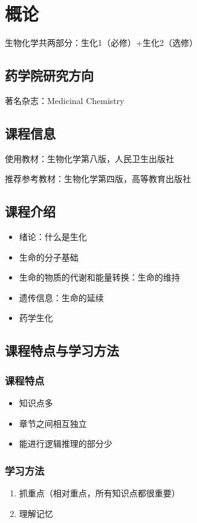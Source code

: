 \section{概论}%
\label{sec:概论}
生物化学共两部分：生化1（必修）+生化2（选修）
\subsection{药学院研究方向}%
\label{sub:药学院研究方向}
著名杂志：Medicinal Chemistry
\subsection{课程信息}%
\label{sub:课程信息}
使用教材：生物化学第八版，人民卫生出版社

推荐参考教材：生物化学第四版，高等教育出版社
\subsection{课程介绍}%
\label{sub:课程介绍}
\begin{itemize}
    \item 绪论：什么是生化
    \item 生命的分子基础
    \item 生命的物质的代谢和能量转换：生命的维持
    \item 遗传信息：生命的延续
    \item 药学生化
\end{itemize}
\subsection{课程特点与学习方法}%
\label{sub:课程特点与学习方法}
\subsubsection*{课程特点}%
\label{subsub:课程特点}
\begin{itemize}
    \item 知识点多
    \item 章节之间相互独立
    \item 能进行逻辑推理的部分少
\end{itemize}
\subsubsection*{学习方法}%
\label{subsub:学习方法}
\begin{enumerate}
    \item 抓重点（相对重点，所有知识点都很重要）
    \item 理解记忆
\end{enumerate}
